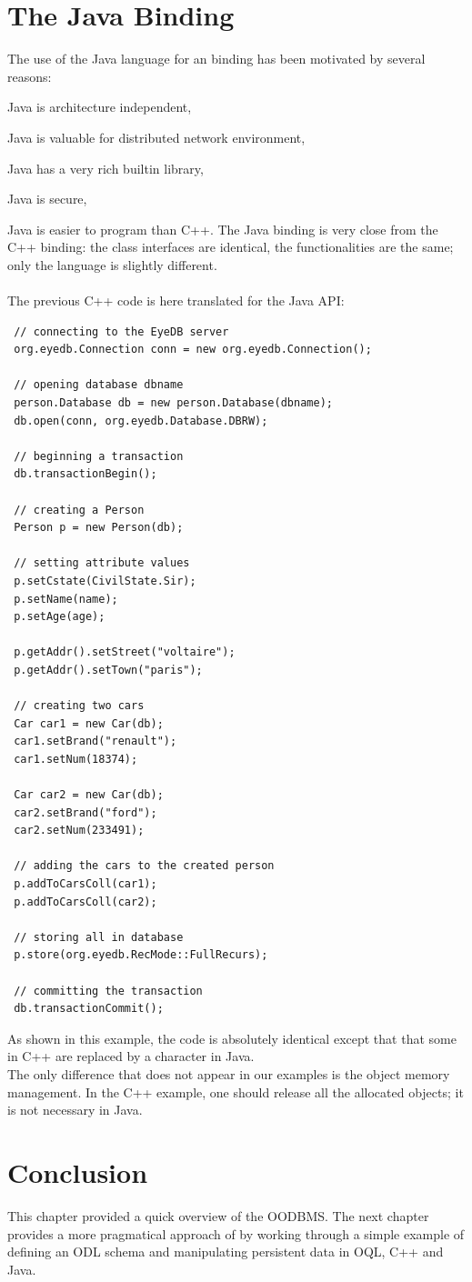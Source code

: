 \section{The Java Binding}
The use of the Java language for an \eyedb binding has been motivated by
several reasons:
\be
\item Java is architecture independent,
\item Java is valuable for distributed network environment,
\item Java has a very rich builtin library,
\item Java is secure,
\item Java is easier to program than C++.
\ee
The Java binding is very close from the C++ binding: the
class interfaces are identical, the functionalities
are the same; only the language is slightly different.
\\
\\
The previous C++ code is here translated for the \eyedb Java API:
{\verbsize
\begin{verbatim}
 // connecting to the EyeDB server
 org.eyedb.Connection conn = new org.eyedb.Connection();

 // opening database dbname
 person.Database db = new person.Database(dbname);
 db.open(conn, org.eyedb.Database.DBRW);

 // beginning a transaction
 db.transactionBegin();

 // creating a Person
 Person p = new Person(db);

 // setting attribute values
 p.setCstate(CivilState.Sir);
 p.setName(name);
 p.setAge(age);

 p.getAddr().setStreet("voltaire");
 p.getAddr().setTown("paris");

 // creating two cars
 Car car1 = new Car(db);
 car1.setBrand("renault");
 car1.setNum(18374);

 Car car2 = new Car(db);
 car2.setBrand("ford");
 car2.setNum(233491);

 // adding the cars to the created person
 p.addToCarsColl(car1);
 p.addToCarsColl(car2);

 // storing all in database
 p.store(org.eyedb.RecMode::FullRecurs);

 // committing the transaction
 db.transactionCommit();
\end{verbatim}
}
As shown in this example, the code is absolutely identical except
that that some \ttv{->} in C++ are replaced by a  character
in Java.
\\
The only difference that does not appear in our examples is the
object memory management. In the C++ example, one should release
all the allocated objects; it is not necessary in Java.
\section{Conclusion}
This chapter provided a quick overview of the \eyedb OODBMS. The next
chapter provides a more pragmatical approach of \eyedb by working through 
a simple
example of defining an ODL schema and manipulating persistent data in OQL,
C++ and Java.


